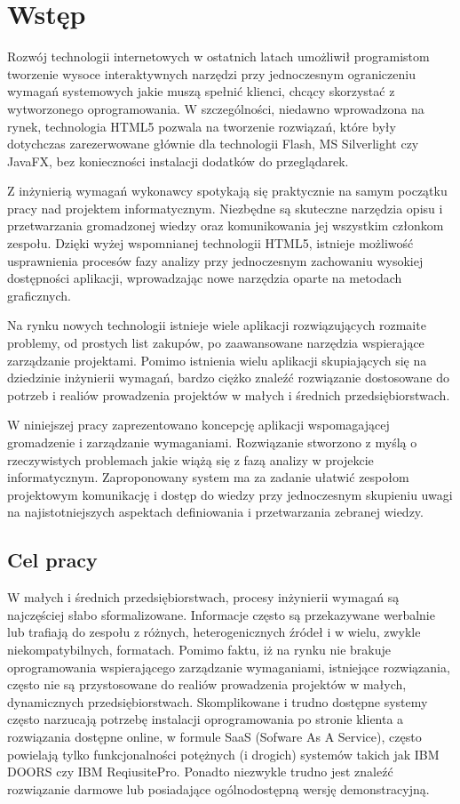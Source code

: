 \chapter{Wstęp}

    Rozwój technologii internetowych w ostatnich latach umożliwił programistom tworzenie wysoce interaktywnych narzędzi przy jednoczesnym ograniczeniu wymagań systemowych jakie muszą spełnić klienci, chcący skorzystać z wytworzonego oprogramowania. W szczególności, niedawno wprowadzona na rynek, technologia HTML5 pozwala na tworzenie rozwiązań, które były dotychczas zarezerwowane głównie dla technologii Flash, MS Silverlight czy JavaFX, bez konieczności instalacji dodatków do przeglądarek.

    Z inżynierią wymagań wykonawcy spotykają się praktycznie na samym początku pracy nad projektem informatycznym. Niezbędne są skuteczne narzędzia opisu i przetwarzania gromadzonej wiedzy oraz komunikowania jej wszystkim członkom zespołu. Dzięki wyżej wspomnianej technologii HTML5, istnieje możliwość usprawnienia procesów fazy analizy przy jednoczesnym zachowaniu wysokiej dostępności aplikacji, wprowadzając nowe narzędzia oparte na metodach graficznych. 

    Na rynku nowych technologii istnieje wiele aplikacji rozwiązujących rozmaite problemy, od prostych list zakupów, po zaawansowane narzędzia wspierające zarządzanie projektami. Pomimo istnienia wielu aplikacji skupiających się na dziedzinie inżynierii wymagań, bardzo ciężko znaleźć rozwiązanie dostosowane do potrzeb i realiów prowadzenia projektów w małych i średnich przedsiębiorstwach. 
          
    W niniejszej pracy zaprezentowano koncepcję aplikacji wspomagającej gromadzenie i zarządzanie wymaganiami. Rozwiązanie stworzono z myślą o rzeczywistych problemach jakie wiążą się z fazą analizy w projekcie informatycznym. Zaproponowany system ma za zadanie ułatwić zespołom projektowym komunikację i dostęp do wiedzy przy jednoczesnym skupieniu uwagi na najistotniejszych aspektach definiowania i przetwarzania zebranej wiedzy.


    \section{Cel pracy}

      W małych i średnich przedsiębiorstwach, procesy inżynierii wymagań są najczęściej słabo sformalizowane. Informacje często są przekazywane werbalnie lub trafiają do zespołu z różnych, heterogenicznych źródeł i w wielu, zwykle niekompatybilnych, formatach. Pomimo faktu, iż na rynku nie brakuje oprogramowania wspierającego zarządzanie wymaganiami, istniejące rozwiązania, często nie są przystosowane do realiów prowadzenia projektów w małych, dynamicznych przedsiębiorstwach. Skomplikowane i trudno dostępne systemy często narzucają potrzebę instalacji oprogramowania po stronie klienta a rozwiązania dostępne online, w formule SaaS (Sofware As A Service), często powielają tylko funkcjonalności potężnych (i drogich) systemów takich jak IBM DOORS czy IBM ReqiusitePro. Ponadto niezwykle trudno jest znaleźć rozwiązanie darmowe lub posiadające ogólnodostępną wersję demonstracyjną. 

